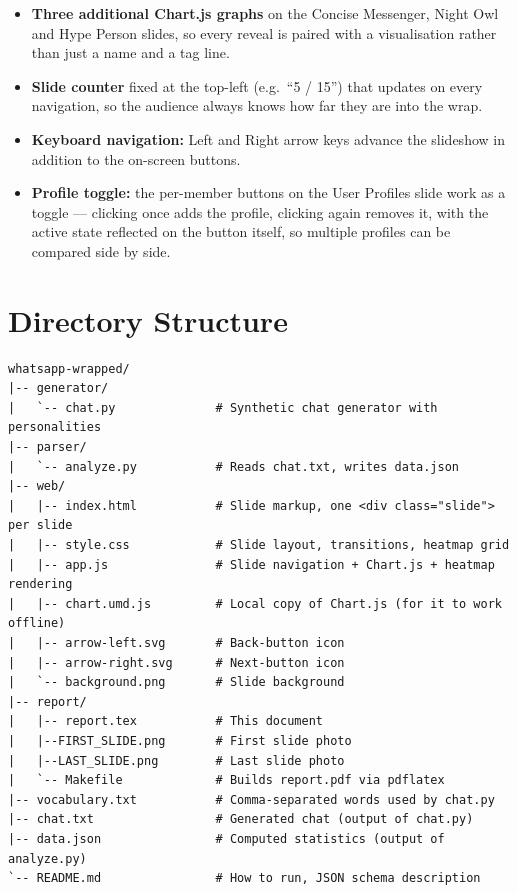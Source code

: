 \documentclass[12pt]{article}
\begin{document}
\begin{itemize}
    \item \textbf{Three additional Chart.js graphs} on the Concise Messenger,
    Night Owl and Hype Person slides, so every reveal is paired with a
    visualisation rather than just a name and a tag line.
    \item \textbf{Slide counter} fixed at the top-left (e.g.\ ``5 / 15'')
    that updates on every navigation, so the audience always knows how far
    they are into the wrap.
    \item \textbf{Keyboard navigation:} Left and Right arrow keys advance the
    slideshow in addition to the on-screen buttons.
    \item \textbf{Profile toggle:} the per-member buttons on the User
    Profiles slide work as a toggle --- clicking once adds the profile,
    clicking again removes it, with the active state reflected on the button
    itself, so multiple profiles can be compared side by side.
\end{itemize}


\section{Directory Structure}

\begin{verbatim}
whatsapp-wrapped/
|-- generator/
|   `-- chat.py              # Synthetic chat generator with personalities
|-- parser/
|   `-- analyze.py           # Reads chat.txt, writes data.json
|-- web/
|   |-- index.html           # Slide markup, one <div class="slide"> per slide
|   |-- style.css            # Slide layout, transitions, heatmap grid
|   |-- app.js               # Slide navigation + Chart.js + heatmap rendering
|   |-- chart.umd.js         # Local copy of Chart.js (for it to work offline)
|   |-- arrow-left.svg       # Back-button icon
|   |-- arrow-right.svg      # Next-button icon
|   `-- background.png       # Slide background
|-- report/
|   |-- report.tex           # This document
|   |--FIRST_SLIDE.png       # First slide photo   
|   |--LAST_SLIDE.png        # Last slide photo
|   `-- Makefile             # Builds report.pdf via pdflatex
|-- vocabulary.txt           # Comma-separated words used by chat.py
|-- chat.txt                 # Generated chat (output of chat.py)
|-- data.json                # Computed statistics (output of analyze.py)
`-- README.md                # How to run, JSON schema description
\end{verbatim}
\end{document}
